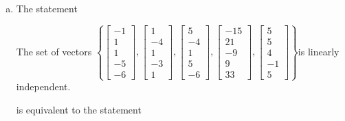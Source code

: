 \begin{exerciseAnswer}
\begin{enumerate}[(a)]
\item The statement 
\begin{center}\begin{minipage}{0.8\textwidth}
 The set of vectors \( \left\{ \left[\begin{array}{c}
-1 \\
1 \\
1 \\
-5 \\
-6
\end{array}\right] , \left[\begin{array}{c}
1 \\
-4 \\
1 \\
-3 \\
1
\end{array}\right] , \left[\begin{array}{c}
5 \\
-4 \\
1 \\
5 \\
-6
\end{array}\right] , \left[\begin{array}{c}
-15 \\
21 \\
-9 \\
9 \\
33
\end{array}\right] , \left[\begin{array}{c}
5 \\
5 \\
4 \\
-1 \\
5
\end{array}\right] \right\} \)is linearly independent.
\end{minipage}\end{center}
     is equivalent to the statement 
\begin{center}\begin{minipage}{0.8\textwidth}
 The vector equation \( x_{1} \left[\begin{array}{c}
-1 \\
1 \\
1 \\
-5 \\
-6
\end{array}\right] + x_{2} \left[\begin{array}{c}
1 \\
-4 \\

\end{array}
\end{minipage}
\end{center}
\end{enumerate}
\end{exerciseAnswer}
